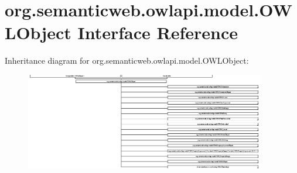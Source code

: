 \hypertarget{interfaceorg_1_1semanticweb_1_1owlapi_1_1model_1_1_o_w_l_object}{\section{org.\-semanticweb.\-owlapi.\-model.\-O\-W\-L\-Object Interface Reference}
\label{interfaceorg_1_1semanticweb_1_1owlapi_1_1model_1_1_o_w_l_object}
}
Inheritance diagram for org.\-semanticweb.\-owlapi.\-model.\-O\-W\-L\-Object\-:\begin{figure}[H]
\begin{center}
\leavevmode
\includegraphics[height=4.247787cm]{interfaceorg_1_1semanticweb_1_1owlapi_1_1model_1_1_o_w_l_object}
\end{center}
\end{figure}
